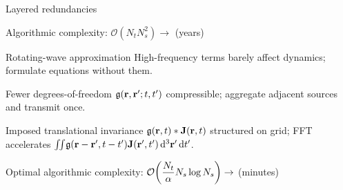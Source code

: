 \documentclass[aspectratio=169, usenames, dvipsnames]{beamer}
\begin{document}
\begin{frame}{Layered redundancies}
  \begin{center}
    Algorithmic complexity: $\displaystyle\mathcal{O}(N_t N_s^2) \to$ \alert{(years)}
  \end{center}
  \begin{block}{Rotating-wave approximation}
    High-frequency terms barely affect dynamics; formulate equations without them.
  \end{block}
  \begin{block}{Fewer degrees-of-freedom}
    $\mathfrak{g}(\vb{r}, \vb{r}'; t, t')$ compressible; aggregate adjacent sources and transmit once.
  \end{block}
  \begin{block}{Imposed translational invariance}
    $\mathfrak{g}(\vb{r}, t) * \vb{J}(\vb{r}, t)$ structured on grid; FFT accelerates $\iint_{}\mathfrak{g}(\vb{r} - \vb{r}', t - t') \vb{J}(\vb{r'}, t') \dd[3]{\vb{r}'} \dd{t'}$.
  \end{block}
  \begin{center}
    Optimal algorithmic complexity: $\displaystyle\mathcal{O}\qty(\frac{N_t}{\alpha} N_s \log N_s) \to$ \alert{(minutes)}
  \end{center}
\end{frame}
\end{document}
